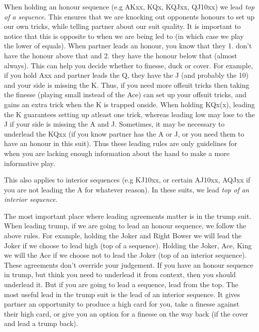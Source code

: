 \documentclass[a4paper]{JoshCards}
\begin{document}
When holding an honour sequence (e.g AKxx, KQx, KQJxx, QJ10xx) we lead \textit{top of a sequence}. This ensures that we are knocking out opponents honours to set up our own tricks, while telling partner about our suit quality. It is important to notice that this is opposite to when we are being led to (in which case we play the lower of equals). When partner leads an honour, you know that they 1. don't have the honour above that and 2. they have the honour below that (almost always). This can help you decide whether to finesse, duck or cover. For example, if you hold Axx and partner leads the Q, they have the J (and probably the 10) and your side is missing the K. Thus, if you need more offsuit tricks then taking the finesse (playing small instead of the Ace) can set up your offsuit tricks, and gains an extra trick when the K is trapped onside. When holding KQx(x), leading the K guarantees setting up atleast one trick, whereas leading low may lose to the J if your side is missing the A and J. Sometimes, it may be necessary to underlead the KQxx (if you know partner has the A or J, or you need them to have an honour in this suit). Thus these leading rules are only guidelines for when you are lacking enough information about the hand to make a more informative play.


This also applies to interior sequences (e.g KJ10xx, or certain AJ10xx, AQJxx if you are not leading the A for whatever reason). In these suits, we lead \textit{top of an interior sequence}.

The most important place where leading agreements matter is in the trump suit. When leading trump, if we are going to lead an honour sequence, we follow the above rules. For example, holding the Joker and Right Bower we will lead the Joker if we choose to lead high (top of a sequence). Holding the Joker, Ace, King we will the Ace if we choose not to lead the Joker (top of an interior sequence). These agreements don't override your judgement. If you have an honour sequence in trump, but think you need to underlead it from context, then you should underlead it. But if you are going to lead a sequence, lead from the top. The most useful lead in the trump suit is the lead of an interior sequence. It gives partner an opportunity to produce a high card for you, take a finesse against their high card, or give you an option for a finesse on the way back (if the cover and lead a trump back).
\end{document}
